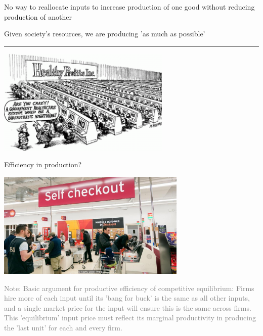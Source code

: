 \documentclass[]{article}
\providecommand{\tightlist}{%
  \setlength{\itemsep}{0pt}\setlength{\parskip}{0pt}}
\begin{document}
\begin{description}
\tightlist
\item[Efficiency in production (being on the PPF)]
No way to reallocate inputs to increase production of one good without
reducing production of another
\end{description}

\bigskip

\begin{centering}

Given society's resources, we are producing 'as much as possible'

\end{centering}

\begin{center}\rule{0.5\linewidth}{\linethickness}\end{center}

\includegraphics[height=2in]{picsfigs/hightower_cartoon1.png}

Efficiency in production?

\includegraphics[height=2in]{picsfigs/self-checkout.jpg}

\textcolor{gray}{Note: Basic argument for productive efficiency of competitive equilibrium:
Firms hire more of each input until its 'bang for buck' is the same as all other inputs,
and a single market price for the input will ensure this is the same across firms.
This 'equilibrium' input price must reflect its marginal productivity
in producing the 'last unit' for each and every firm.}
\end{document}
